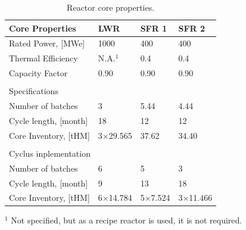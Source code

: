 \documentclass[12pt]{article}
\begin{document}
\begin{table}[h!]
    \centering
    \begin{tabularx}{350pt}{lXXX}
      \hline
      Core Properties       &  LWR             &  SFR 1           &  SFR 2            \\
      \hline
      Rated Power, [MWe]    &  1000            &  400             &  400              \\
      Thermal Efficiency    &  N.A.$^1$        &  0.4             &  0.4              \\
      Capacity Factor       &  0.90            &  0.90            &  0.90             \\
                                                                                      \\
      \multicolumn{4}{X}{Specifications}                                              \\ 
      \hline
      \hline
      Number of batches     &  3               &  5.44            &  4.44             \\
      Cycle length, [month] &  18              &  12              &  12               \\
      Core Inventory, [tHM] &  3$\times$29.565 &  37.62           &  34.40            \\
                                                                                      \\
      \multicolumn{4}{l}{Cyclus inplementation}                                       \\ 
      \hline
      \hline
      Number of batches     &  6               &  5               &  3                \\
      Cycle length, [month] &  9               &  13              &  18               \\
      Core Inventory, [tHM] &  6$\times$14.784 &  5$\times$7.524  &  3$\times$11.466  \\
      \hline
    \end{tabularx}
    \caption{Reactor core properties.}
    \label{tab:reactor}
    \footnotesize{$^1$ Not specified, but as a recipe reactor is used, it is not required.}
\end{table}

\end{document}
